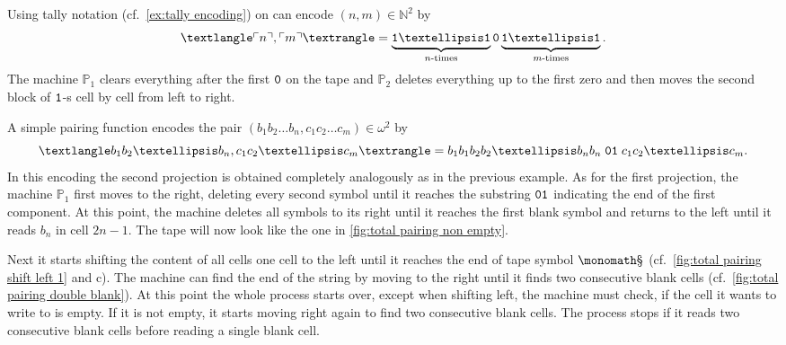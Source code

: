 \begin{exam}
  \begin{exlist}
    \item\label{ex:tally pairing}
    Using tally notation (cf.~\cref{ex:tally encoding}) on can encode \((n, m) ∈
    ℕ^2\) by
    \[
      ⟨\enc{n}, \enc{m}⟩ = \underbrace{\one … \one}_{n\text{-times}} \zer \underbrace{\one … \one}_{m\text{-times}}.
    \]
    The machine \(\mathbb{P}_1\) clears everything after the first \(\mathtt{0}\) on
    the tape and \(\mathbb{P}_2\) deletes everything up to the first zero and
    then moves the second block of \(\mathtt{1}\)-s cell by cell from left to right.

    \item\label{ex:total pairing}
    A simple pairing function encodes the pair \((b_1b_2…b_n, c_1c_2…c_m) ∈ ω^2\)
    by
    \[
      ⟨b_1b_2…b_n, c_1c_2…c_m⟩ = b_1b_1b_2b_2…b_nb_n \; \zer\one \; c_1c_2…c_m.
    \]
    In this encoding the second projection is obtained completely analogously as
    in the previous example. As for the first projection, the machine
    \(\mathbb{P}_1\) first moves to the right, deleting every second symbol
    until it reaches the substring \(\mathtt{0}\mathtt{1}\) indicating the end of the first
    component. At this point, the machine deletes all symbols to its right until
    it reaches the first blank symbol and returns to the left until it reads
    \(b_n\) in cell \(2n - 1\). The tape will now look like the one in
    \cref{fig:total pairing non empty}.

    Next it starts shifting the content of all cells one cell to the left until
    it reaches the end of tape symbol \(\sta\) (cf.~\cref{fig:total pairing
    shift left 1} and c). The machine can find the end of the string by moving
    to the right until it finds two consecutive blank cells (cf.~\cref{fig:total
    pairing double blank}). At this point the whole process starts over, except
    when shifting left, the machine must check, if the cell it wants to write to
    is empty. If it is not empty, it starts moving right again to find two
    consecutive blank cells. The process stops if it reads two consecutive blank
    cells before reading a single blank cell.
  \end{exlist}
\end{exam}

